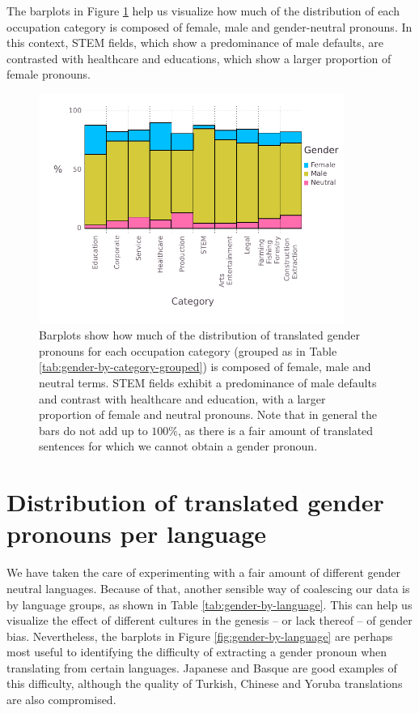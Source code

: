 \documentclass[fleqn,10pt]{article}
\begin{document}
The barplots in Figure \ref{fig:gender-by-category} help us visualize how much of the distribution of each occupation category is composed of female, male and gender-neutral pronouns. In this context, STEM fields, which show a predominance of male defaults, are contrasted with healthcare and educations, which show a larger proportion of female pronouns.

\begin{figure}[H]
	\centering
	\includegraphics[width=10cm]{pictures/gender-by-category-grouped}
	\caption{Barplots show how much of the distribution of translated gender pronouns for each occupation category (grouped as in Table \ref{tab:gender-by-category-grouped}) is composed of female, male and neutral terms. STEM fields exhibit a predominance of male defaults and contrast with healthcare and education, with a larger proportion of female and neutral pronouns. Note that in general the bars do not add up to $100\%$, as there is a fair amount of translated sentences for which we cannot obtain a gender pronoun.}
	\label{fig:gender-by-category}
\end{figure}

\section{Distribution of translated gender pronouns per language}

We have taken the care of experimenting with a fair amount of different gender neutral languages. Because of that, another sensible way of coalescing our data is by language groups, as shown in Table \ref{tab:gender-by-language}. This can help us visualize the effect of different cultures in the genesis -- or lack thereof -- of gender bias. Nevertheless, the barplots in Figure \ref{fig:gender-by-language} are perhaps most useful to identifying the difficulty of extracting a gender pronoun when translating from certain languages. Japanese and Basque are good examples of this difficulty, although the quality of Turkish, Chinese and Yoruba translations are also compromised.
\end{document}
